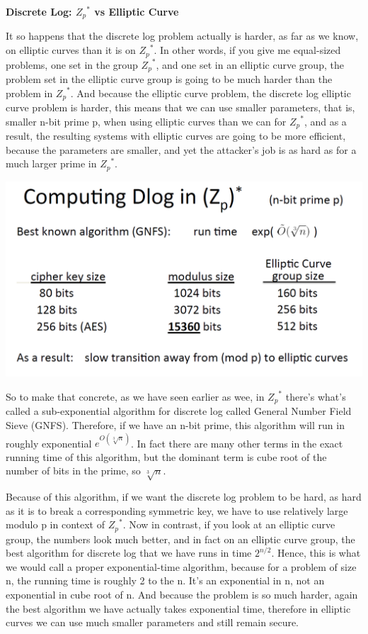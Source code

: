 \documentclass[11pt]{article}
\makeatletter
\def\maxwidth{\ifdim\Gin@nat@width>\linewidth\linewidth
    \else\Gin@nat@width\fi}
\let\Oldincludegraphics\includegraphics
\renewcommand{\includegraphics}[1]{\Oldincludegraphics[width=.8\maxwidth]{#1}}
\makeatother
\begin{document}
\textbf{Discrete Log: \({Z_{p}}^{*}\) vs Elliptic Curve}

It so happens that the discrete log problem actually is harder, as far
as we know, on elliptic curves than it is on \({Z_{p}}^{*}\). In other
words, if you give me equal-sized problems, one set in the group
\({Z_{p}}^{*}\), and one set in an elliptic curve group, the problem set
in the elliptic curve group is going to be much harder than the problem
in \({Z_{p}}^{*}\). And because the elliptic curve problem, the discrete
log elliptic curve problem is harder, this means that we can use smaller
parameters, that is, smaller n-bit prime p, when using elliptic curves
than we can for \({Z_{p}}^{*}\), and as a result, the resulting systems
with elliptic curves are going to be more efficient, because the
parameters are smaller, and yet the attacker's job is as hard as for a
much larger prime in \({Z_{p}}^{*}\).

\includegraphics{./Images/NT-ZpStarVsElliptic.png}

So to make that concrete, as we have seen earlier as wee, in
\({Z_{p}}^{*}\) there's what's called a sub-exponential algorithm for
discrete log called General Number Field Sieve (GNFS). Therefore, if we
have an n-bit prime, this algorithm will run in roughly exponential
\(e^{O(\sqrt[3]{n})}\). In fact there are many other terms in the exact
running time of this algorithm, but the dominant term is cube root of
the number of bits in the prime, so \(\sqrt[3]{n}\).

Because of this algorithm, if we want the discrete log problem to be
hard, as hard as it is to break a corresponding symmetric key, we have
to use relatively large modulo p in context of \({Z_{p}}^{*}\). Now in
contrast, if you look at an elliptic curve group, the numbers look much
better, and in fact on an elliptic curve group, the best algorithm for
discrete log that we have runs in time \(2^{n/2}\). Hence, this is what
we would call a proper exponential-time algorithm, because for a problem
of size n, the running time is roughly 2 to the n. It's an exponential
in n, not an exponential in cube root of n. And because the problem is
so much harder, again the best algorithm we have actually takes
exponential time, therefore in elliptic curves we can use much smaller
parameters and still remain secure.
\end{document}
